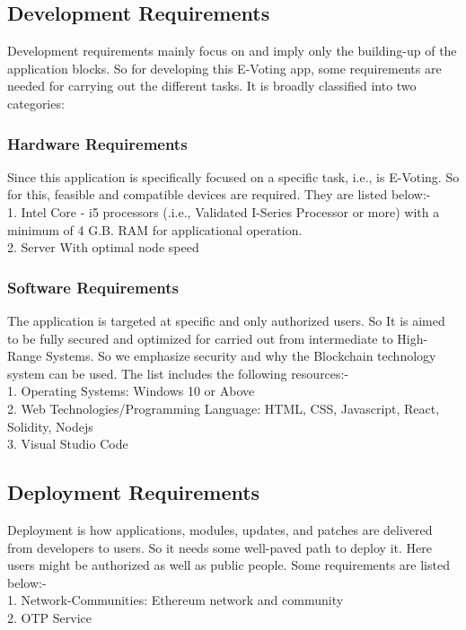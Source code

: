 \documentclass[a4paper,12pt]{report}
\begin{document}
\subsection{Development Requirements}
Development requirements mainly focus on and imply only the building-up of the application blocks. So for developing this E-Voting app, some requirements are needed for carrying out the different tasks. It is broadly classified into two categories:

\subsubsection{Hardware Requirements}
Since this application is specifically focused on a specific task, i.e., is E-Voting. So for this, feasible and compatible devices are required. They are listed below:-\\
1. Intel Core - i5 processors (.i.e., Validated I-Series Processor or more) with a minimum of 4 G.B. RAM for applicational operation.\\
2. Server With optimal node speed  

\subsubsection{Software Requirements}
The application is targeted at specific and only authorized users. So It is aimed to be fully secured and optimized for carried out from intermediate to High-Range Systems. So we emphasize security and why the Blockchain technology system can be used. The list includes the following resources:-\\
1. Operating Systems: Windows 10 or Above\\
2. Web Technologies/Programming Language: HTML, CSS, Javascript, React, Solidity, Nodejs\\
3. Visual Studio Code

\subsection{Deployment Requirements}
Deployment is how applications, modules, updates, and patches are delivered from developers to users. So it needs some well-paved path to deploy it. Here users might be authorized as well as public people. Some requirements are listed below:-\\
1. Network-Communities: Ethereum network and community\\
2. OTP Service
\end{document}
